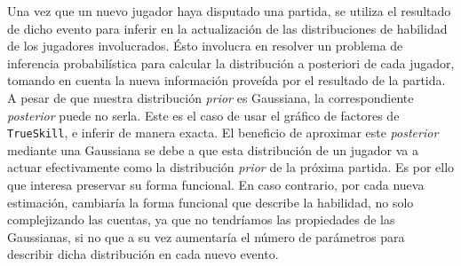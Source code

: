 \documentclass[11pt,twoside, spanish]{report} %
\begin{document}
Una vez que un nuevo jugador haya disputado una partida, se utiliza el resultado de dicho evento para inferir en la actualizaci\'on de las distribuciones de habilidad de los jugadores involucrados.
\'Esto involucra en resolver un problema de inferencia probabil\'istica para calcular la distribuci\'on a posteriori  de cada jugador,  tomando en cuenta la nueva informaci\'on prove\'ida por el resultado de la partida.
A pesar de que nuestra distribuci\'on \textit{prior} es Gaussiana, la correspondiente \textit{posterior} puede no serla.
Este es el caso de usar el gr\'afico de factores de \texttt{TrueSkill}, e inferir de manera exacta.
El beneficio de aproximar este \textit{posterior} mediante una Gaussiana se debe a que esta distribuci\'on de un jugador va a actuar efectivamente como la distribuci\'on \textit{prior} de la pr\'oxima partida.
Es por ello que interesa preservar su forma funcional.
En caso contrario, por cada nueva estimaci\'on, cambiar\'ia la forma funcional que describe la habilidad, no solo complejizando las cuentas, ya que no tendr\'iamos las propiedades de las Gaussianas, si no que a su vez aumentar\'ia el n\'umero de par\'ametros para describir dicha distribuci\'on en cada nuevo evento.
\end{document}
